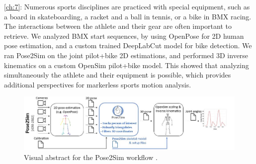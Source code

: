 \vspace*{0.2cm}
\noindent\autoref{ch:7}: Numerous sports disciplines are practiced with special equipment, such as a board in skateboarding, a racket and a ball in tennis, or a bike in BMX racing. The interactions between the athlete and their gear are often important to retrieve. We analyzed BMX start sequences, by using OpenPose for 2D human pose estimation, and a custom trained DeepLabCut model for bike detection. We ran Pose2Sim on the joint {pilot+bike} 2D estimations, and performed 3D inverse kinematics on a custom OpenSim {pilot+bike} model. This showed that analyzing simultaneously the athlete and their equipment is possible, which provides additional perspectives for markerless sports motion analysis. 


\begin{figure}[hbtp]
	\centering
            \def\svgwidth{1\columnwidth}
            \fontsize{10pt}{10pt}\selectfont
            \includegraphics[width=\linewidth]{"../Intro/Figures/Fig_VisAbstract1.JPG"}
            \caption{Visual abstract for the Pose2Sim workflow \cite{Pagnon2022b}.}
            \label{fig_visabstract1_1}
\end{figure}

